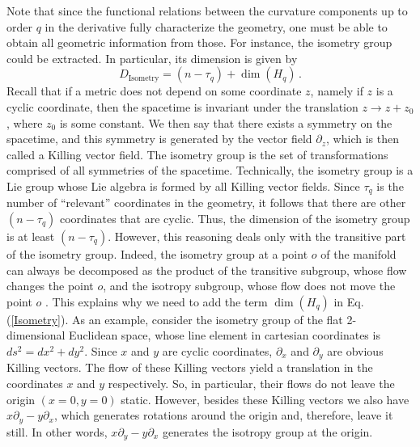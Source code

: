 \documentclass[twocolumn,prd,aps,showpacs,showkeys,amsmath,amssymb]{revtex4-1}
\begin{document}
Note that since the functional relations between the curvature components up to order $q$ in the derivative fully characterize the geometry, one must be able to obtain all geometric information from those. For instance, the isometry group could be extracted. In particular, its dimension is given by
\begin{equation}\label{Isometry}
  D_{\textrm{Isometry}} = (n-\tau_q) + \dim(H_q)\,.
\end{equation}
Recall that if a metric does not depend on some coordinate $z$, namely if $z$ is a cyclic coordinate, then the spacetime is invariant under the translation $z\rightarrow z+ z_0$, where $z_0$ is some constant. We then say that there exists a symmetry on the spacetime, and this symmetry is generated by the vector field $\partial_z$, which is then called a Killing vector field. The isometry group is the set of transformations comprised of all symmetries of the spacetime. Technically, the isometry group is a Lie group whose Lie algebra is formed by all Killing vector fields. Since $\tau_q$ is the number of ``relevant'' coordinates in the geometry, it follows that there are other $(n-\tau_q)$ coordinates that are cyclic. Thus, the dimension of the isometry group is at least $(n-\tau_q)$. However, this reasoning deals only with the transitive part of the isometry group. Indeed, the isometry group at a point $o$ of the manifold can always be decomposed as the product of the transitive subgroup, whose flow changes the point $o$, and the isotropy subgroup, whose flow does not move the point $o$ \cite{Stephani}. This explains why we need to add the term $\dim(H_q)$ in Eq. (\ref{Isometry}). As an example, consider the isometry group of the flat 2-dimensional Euclidean space, whose line element in cartesian coordinates is $ds^2= dx^2+dy^2$. Since $x$ and $y$ are cyclic coordinates, $\partial_x$ and $\partial_y$ are obvious Killing vectors. The flow of these Killing vectors yield a translation in the coordinates $x$ and $y$ respectively. So, in particular, their flows do not leave the origin $(x=0,y=0)$ static. However, besides these Killing vectors we also have $x\partial_y - y\partial_x$, which generates rotations around the origin and, therefore, leave it still. In other words, $x\partial_y - y\partial_x$ generates the isotropy group at the origin.
\end{document}

